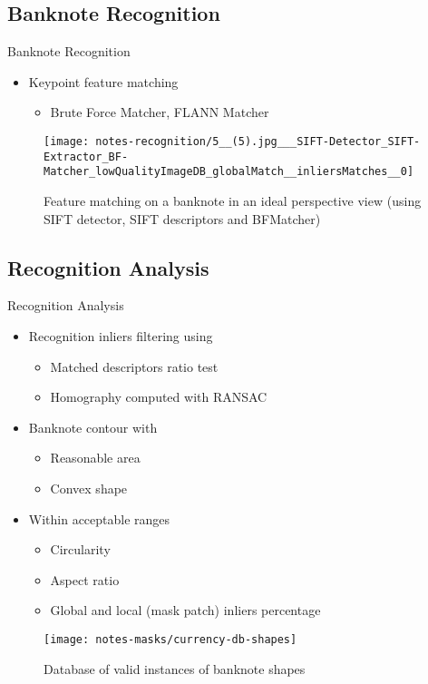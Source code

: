 \subsection{Banknote Recognition}
\begin{frame}{Banknote Recognition}
	\begin{itemize}
		\item Keypoint feature matching
		\begin{itemize}
			\item Brute Force Matcher, FLANN Matcher
		\end{itemize}
	\end{itemize}

	\begin{figure}[H]
		\centering
		\texttt{[image: notes-recognition/5\_\_(5).jpg\_\_\_SIFT-Detector\_SIFT-Extractor\_BF-Matcher\_lowQualityImageDB\_globalMatch\_\_inliersMatches\_\_0]}
		\caption{Feature matching on a banknote in an ideal perspective view (using SIFT detector, SIFT descriptors and BFMatcher)}
		\label{fig:recognition-front}
	\end{figure}
\end{frame}


\subsection{Recognition Analysis}
\begin{frame}{Recognition Analysis}
	\begin{itemize}
		\item Recognition inliers filtering using
		\begin{itemize}
			\item Matched descriptors ratio test
			\item Homography computed with RANSAC
		\end{itemize}
		
		\item Banknote contour with
		\begin{itemize}
			\item Reasonable area
			\item Convex shape
		\end{itemize}
		
		\item Within acceptable ranges
		\begin{itemize}
			\item Circularity
			\item Aspect ratio
			\item Global and local (mask patch) inliers percentage
		\end{itemize}
	\end{itemize}

	\begin{figure}
		\centering
		\texttt{[image: notes-masks/currency-db-shapes]}
		\caption{Database of valid instances of banknote shapes}
		\label{fig:currency-db-shapes}
	\end{figure}
\end{frame}


